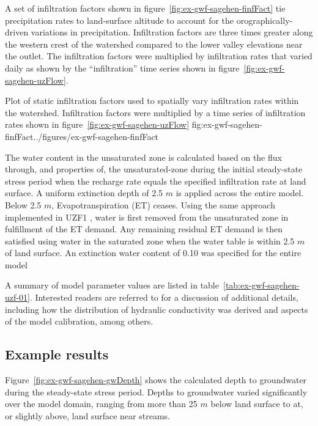 A set of infiltration factors shown in figure~\ref{fig:ex-gwf-sagehen-finfFact} tie precipitation rates to land-surface altitude to account for the orographically-driven variations in precipitation.  Infiltration factors are three times greater along the western crest of the watershed compared to the lower valley elevations near the outlet.  The infiltration factors were multiplied by infiltration rates that varied daily as shown by the ``infiltration'' time series shown in figure~\ref{fig:ex-gwf-sagehen-uzFlow}.  

\begin{StandardFigure}
	{Plot of static infiltration factors used to spatially vary infiltration rates within the watershed. Infiltration factors were multiplied by a time series of infiltration rates shown in figure~\ref{fig:ex-gwf-sagehen-uzFlow}}
	{fig:ex-gwf-sagehen-finfFact}{../figures/ex-gwf-sagehen-finfFact}
\end{StandardFigure}

The water content in the unsaturated zone is calculated based on the flux through, and properties of, the unsaturated-zone during the initial steady-state stress period when the recharge rate equals the specified infiltration rate at land surface.  A uniform extinction depth of 2.5 $m$ is applied across the entire model.  Below 2.5 $m$, Evapotranspiration (ET) ceases.  Using the same approach implemented in UZF1 \citep{UZF}, water is first removed from the unsaturated zone in fulfillment of the ET demand.  Any remaining residual ET demand is then  satisfied using water in the saturated zone when the water table is within 2.5 $m$ of land surface.  An extinction water content of 0.10 was specified for the entire model

A summary of model parameter values are listed in table~\ref{tab:ex-gwf-sagehen-uzf-01}. Interested readers are referred to \cite{UZF} for a discussion of additional details, including how the distribution of hydraulic conductivity was derived and aspects of the model calibration, among others.



\subsection{Example results}

Figure~\ref{fig:ex-gwf-sagehen-gwDepth} shows the calculated depth to groundwater during the steady-state stress period.  Depths to groundwater varied significantly over the model domain, ranging from more than 25 $m$ below land surface to at, or slightly above, land surface near streams.

